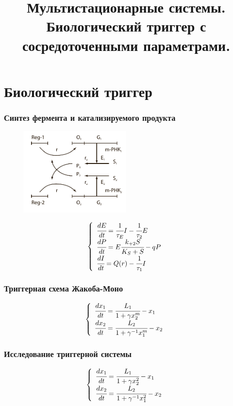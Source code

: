 \documentclass[11pt,pdf,aspectratio=43]{beamer}
\title[]{Мультистационарные системы. Биологический триггер с сосредоточенными 
параметрами.}
\date[]{}
\begin{document}
\begin{frame}[plain]
\maketitle
\end{frame}

\section{Биологический триггер}
\begin{frame}
	\frametitle{Синтез фермента и катализируемого продукта}
	\begin{figure}
		\vspace{-5ex}
		\includegraphics[width=0.5\textwidth]{images/jacob_mono}
	\end{figure}
	\[
	    \left\{ \begin{array}{ll}
	        \cfrac{dE}{dt} = \cfrac{1}{\tau_E}I - \cfrac{1}{\tau_2}E \\
	        \cfrac{dP}{dt} = E\cfrac{k_{+2}S}{K_S + S} - qP \\
	        \cfrac{dI}{dt} = Q(r) - \cfrac{1}{\tau_1}I
	    \end{array} \right.
	\]
\end{frame}
\begin{frame}
	\frametitle{Триггерная схема Жакоба-Моно}
	\[
		\left\{ \begin{array}{ll}
	        \cfrac{dx_1}{dt} = \cfrac{L_1}{1+\gamma x_2^m} - x_1 \\
	        \cfrac{dx_2}{dt} = \cfrac{L_2}{1+\gamma^{-1} x_1^m} - x_2  
	    \end{array} \right.
    \]
\end{frame}
\begin{frame}
	\frametitle{Исследование триггерной системы}
	\[
		\left\{ \begin{array}{ll}
	        \cfrac{dx_1}{dt} = \cfrac{L_1}{1+\gamma x_2^2} - x_1 \\
	        \cfrac{dx_2}{dt} = \cfrac{L_2}{1+\gamma^{-1} x_1^2} - x_2  
	    \end{array} \right.
	\]
\end{frame}
\end{document}

